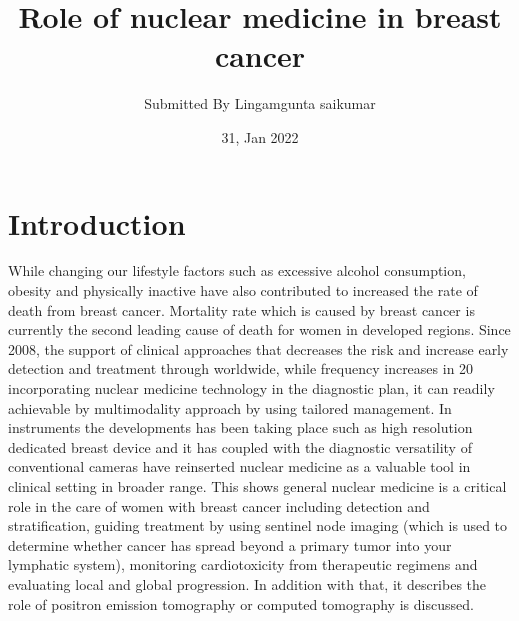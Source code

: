 \documentclass{article}
\title{Role of nuclear medicine in breast cancer}
\author{Submitted By Lingamgunta saikumar}
\date{31, Jan 2022}
\begin{document}
\maketitle

\section{Introduction}
While changing our lifestyle factors such as excessive alcohol consumption, obesity and 
physically inactive have also contributed to increased the rate of death from breast 
cancer. Mortality rate which is caused by breast cancer is currently the second leading 
cause of death for women in developed regions. Since 2008, the support of clinical 
approaches that decreases the risk and increase early detection and treatment through 
worldwide, while frequency increases in 20%
incorporating nuclear medicine technology in the diagnostic plan, it can readily achievable 
by multimodality approach by using tailored management. In instruments the 
developments has been taking place such as high resolution dedicated breast device and it 
has coupled with the diagnostic versatility of conventional cameras have reinserted 
nuclear medicine as a valuable tool in clinical setting in broader range. This shows general 
nuclear medicine is a critical role in the care of women with breast cancer including 
detection and stratification, guiding treatment by using sentinel node imaging (which is 
used to determine whether cancer has spread beyond a primary tumor into your 
lymphatic system), monitoring cardiotoxicity from therapeutic regimens and 
evaluating local and global progression. In addition with that, it describes the role of 
positron emission tomography or computed tomography is discussed.
\end{document}
